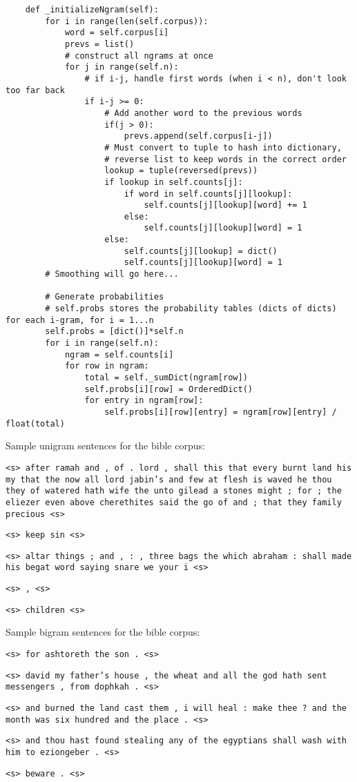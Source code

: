 \documentclass{article}
\begin{document}
{\small
\begin{verbatim}
    def _initializeNgram(self):
        for i in range(len(self.corpus)):
            word = self.corpus[i]
            prevs = list()
            # construct all ngrams at once
            for j in range(self.n):
                # if i-j, handle first words (when i < n), don't look too far back
                if i-j >= 0:
                    # Add another word to the previous words
                    if(j > 0):
                        prevs.append(self.corpus[i-j])
                    # Must convert to tuple to hash into dictionary,
                    # reverse list to keep words in the correct order
                    lookup = tuple(reversed(prevs))
                    if lookup in self.counts[j]:
                        if word in self.counts[j][lookup]:
                            self.counts[j][lookup][word] += 1
                        else:
                            self.counts[j][lookup][word] = 1
                    else:
                        self.counts[j][lookup] = dict()
                        self.counts[j][lookup][word] = 1
        # Smoothing will go here...

        # Generate probabilities
        # self.probs stores the probability tables (dicts of dicts) for each i-gram, for i = 1...n
        self.probs = [dict()]*self.n
        for i in range(self.n):
            ngram = self.counts[i]
            for row in ngram:
                total = self._sumDict(ngram[row])
                self.probs[i][row] = OrderedDict()
                for entry in ngram[row]:
                    self.probs[i][row][entry] = ngram[row][entry] / float(total)
\end{verbatim}}

\newpage
\setlength{\parindent}{0cm}
\newcommand\npar{\par\smallskip}
Sample unigram sentences for the bible corpus:\npar
\texttt{<s> after ramah and , of . lord , shall this that every burnt land his my that the now all lord jabin's and few at flesh is waved he thou they of watered hath wife the unto gilead a stones might ; for ; the eliezer even above cherethites said the go of and ; that they family precious <s>}\npar
\texttt{<s> keep sin <s>}\npar
\texttt{<s> altar things ; and , : , three bags the which abraham : shall made his begat word saying snare we your i <s>}\npar
\texttt{<s> , <s>}\npar
\texttt{<s> children <s>}\npar
\bigskip

Sample bigram sentences for the bible corpus:\npar
\texttt{<s> for ashtoreth the son . <s>}\npar
\texttt{<s> david my father's house , the wheat and all the god hath sent messengers , from dophkah . <s>}\npar
\texttt{<s> and burned the land cast them , i will heal : make thee ? and the month was six hundred and the place . <s>}\npar
\texttt{<s> and thou hast found stealing any of the egyptians shall wash with him to eziongeber . <s>}\npar
\texttt{<s> beware . <s>}\npar
\bigskip
\end{document}
